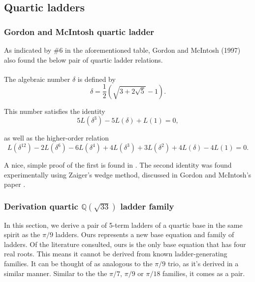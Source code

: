 \documentclass[12pt]{article}
\begin{document}
{\subsection{Quartic ladders}

\subsubsection{Gordon and McIntosh quartic ladder}

As indicated by \#6 in the aforementioned table, Gordon and McIntosh (1997) also found the below pair of  quartic ladder relations. 
\\
\\
\noindent The algebraic number $\delta$ is defined by
\begin{equation*}
    \delta = \frac{1}{2}\left(\sqrt{3+2\sqrt{5}} - 1\right).
    \label{eq:delta-def}
\end{equation*}

\noindent This number satisfies the identity
\begin{equation*}
    5L(\delta^3) - 5L(\delta) + L(1) = 0,
    \label{eq:l-alg-17}
\end{equation*}

\noindent as well as the higher-order relation
\begin{equation*}
    L(\delta^{12}) - 2L(\delta^6) - 6L(\delta^4) + 4L(\delta^3) + 3L(\delta^2) + 4L(\delta) - 4L(1) = 0.
    \label{eq:l-alg-18-19}
\end{equation*}

\noindent A nice, simple proof of the first is found in \cite{Bytsko1999}. The second identity was found experimentally using Zaiger's wedge method,  discussed in Gordon and McIntosh's paper \cite{GordonMcIntosh1997} . 

\subsubsection{Derivation quartic $\mathbb{Q}(\sqrt{33})$ ladder family}


 \noindent In this section, we derive a pair of 5-term ladders of a quartic base in the same spirit as the $\pi/9$ ladders. Ours represents a new base equation and family of ladders. Of the literature consulted, ours is the only base equation that has four real roots. This means it cannot be derived from known ladder-generating families. It can be thought of as analogous to the $\pi/9$ trio,  as it's derived in a similar manner. Similar to the the  $\pi/7$,  $\pi/9$ or  $\pi/18$ families, it comes as a pair. 
 
}
\end{document}

